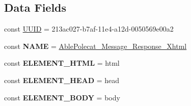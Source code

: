 \subsection*{Data Fields}
\begin{DoxyCompactItemize}
\item 
const \hyperlink{class_able_polecat___message___response___xhtml_a74b892c8c0b86bf9d04c5819898c51e7}{U\+U\+I\+D} = \textquotesingle{}213ac027-\/b7af-\/11e4-\/a12d-\/0050569e00a2\textquotesingle{}
\item 
\hypertarget{class_able_polecat___message___response___xhtml_a244352f035b82b20b0efa506167fd862}{}const {\bfseries N\+A\+M\+E} = \textquotesingle{}\hyperlink{class_able_polecat___message___response___xhtml}{Able\+Polecat\+\_\+\+Message\+\_\+\+Response\+\_\+\+Xhtml}\textquotesingle{}\label{class_able_polecat___message___response___xhtml_a244352f035b82b20b0efa506167fd862}

\item 
\hypertarget{class_able_polecat___message___response___xhtml_a8a4486691c89aa7944b0f5ccf39ba399}{}const {\bfseries E\+L\+E\+M\+E\+N\+T\+\_\+\+H\+T\+M\+L} = \textquotesingle{}html\textquotesingle{}\label{class_able_polecat___message___response___xhtml_a8a4486691c89aa7944b0f5ccf39ba399}

\item 
\hypertarget{class_able_polecat___message___response___xhtml_a0cf8c4ced01a408e29b59adedfe802e2}{}const {\bfseries E\+L\+E\+M\+E\+N\+T\+\_\+\+H\+E\+A\+D} = \textquotesingle{}head\textquotesingle{}\label{class_able_polecat___message___response___xhtml_a0cf8c4ced01a408e29b59adedfe802e2}

\item 
\hypertarget{class_able_polecat___message___response___xhtml_a83a04a4f8d9f88822b1e61a25d5b4d1c}{}const {\bfseries E\+L\+E\+M\+E\+N\+T\+\_\+\+B\+O\+D\+Y} = \textquotesingle{}body\textquotesingle{}\label{class_able_polecat___message___response___xhtml_a83a04a4f8d9f88822b1e61a25d5b4d1c}

\end{DoxyCompactItemize}
